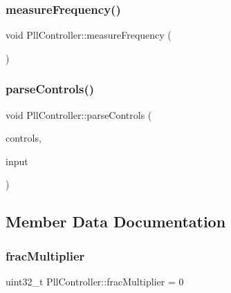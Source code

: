 \mbox{\label{class_pll_controller_a3837757a2e97e0bd256d7ff346e1c624}} 
\subsubsection{\texorpdfstring{measure\+Frequency()}{measureFrequency()}}
{\footnotesize\ttfamily void Pll\+Controller\+::measure\+Frequency (\begin{DoxyParamCaption}\item[{void}]{ }\end{DoxyParamCaption})\hspace{0.3cm}{\ttfamily [inline]}}

\mbox{\label{class_pll_controller_aeb69c603315dde2b197be7fb68752536}} 
\subsubsection{\texorpdfstring{parse\+Controls()}{parseControls()}}
{\footnotesize\ttfamily void Pll\+Controller\+::parse\+Controls (\begin{DoxyParamCaption}\item[{\mbox{\hyperlink{class_via_controls}{Via\+Controls}} $\ast$}]{controls,  }\item[{\mbox{\hyperlink{class_via_input_streams}{Via\+Input\+Streams}} $\ast$}]{input }\end{DoxyParamCaption})}



\subsection{Member Data Documentation}
\mbox{\label{class_pll_controller_a46d1d737b75b6fea470da4478601e5d5}} 
\subsubsection{\texorpdfstring{frac\+Multiplier}{fracMultiplier}}
{\footnotesize\ttfamily uint32\+\_\+t Pll\+Controller\+::frac\+Multiplier = 0}

